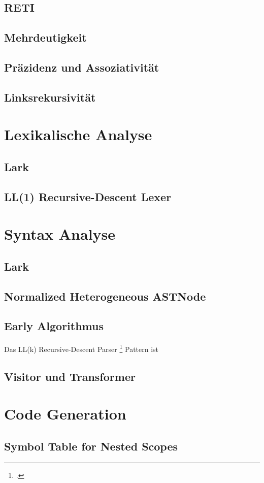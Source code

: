 \subsection{RETI}
\subsection{Mehrdeutigkeit}
\subsection{Präzidenz und Assoziativität}
\subsection{Linksrekursivität}
\section{Lexikalische Analyse}
\subsection{Lark}
\subsection{LL(1) Recursive-Descent Lexer}
\section{Syntax Analyse}
\subsection{Lark}
\subsection{Normalized Heterogeneous ASTNode}
\subsection{Early Algorithmus}
Das LL(k) Recursive-Descent Parser \footcite{parr_language_2009} Pattern ist
\subsection{Visitor und Transformer}
\section{Code Generation}
\subsection{Symbol Table for Nested Scopes}
